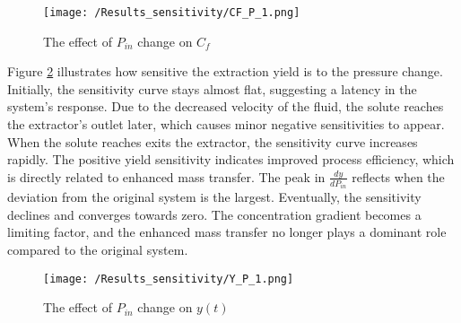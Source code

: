\documentclass[../Article_Sensitivity_Analsysis.tex]{subfiles}
\begin{document}
	\begin{figure}[!ht]
		\centering
		\texttt{[image: /Results\_sensitivity/CF\_P\_1.png]}
		\caption{The effect of $P_{in}$ change on $C_f$}
		\label{fig:Sensitivty_P_CF}
	\end{figure}
	
	Figure \ref{fig:Sensitivty_P_y} illustrates how sensitive the extraction yield is to the pressure change. Initially, the sensitivity curve stays almost flat, suggesting a latency in the system's response. Due to the decreased velocity of the fluid, the solute reaches the extractor's outlet later, which causes minor negative sensitivities to appear. When the solute reaches exits the extractor, the sensitivity curve increases rapidly. The positive yield sensitivity indicates improved process efficiency, which is directly related to enhanced mass transfer. The peak in $\frac{dy}{dP_{in}}$ reflects when the deviation from the original system is the largest. Eventually, the sensitivity declines and converges towards zero. The concentration gradient becomes a limiting factor, and the enhanced mass transfer no longer plays a dominant role compared to the original system.
	
	\begin{figure}[!ht]
		\centering
		\texttt{[image: /Results\_sensitivity/Y\_P\_1.png]}
		\caption{The effect of $P_{in}$ change on $y(t)$}
		\label{fig:Sensitivty_P_y}
	\end{figure}
		
\end{document}
